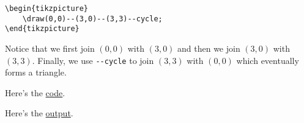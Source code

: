 \documentclass{book}
\begin{document}
\begin{lstlisting}[frame=tlBR]
\begin{tikzpicture}
	\draw(0,0)--(3,0)--(3,3)--cycle;
\end{tikzpicture}
\end{lstlisting}

Notice that we first join $(0,0)$ with $(3,0)$ and then we join $(3,0)$ with $(3,3)$. Finally, we use \lstinline|--cycle| to join $(3,3)$ with $(0,0)$ which eventually forms a triangle.

Here's the \href{https://github.com/0x50-0x42/latex/blob/LaTeX/Tikz/codes/triangle.tex}{code}.

Here's the \href{https://github.com/0x50-0x42/latex/blob/LaTeX/Tikz/codes/triangle.pdf}{output}.
\end{document}
